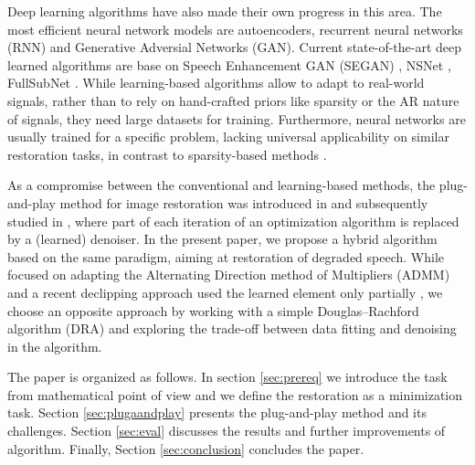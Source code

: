 \documentclass[conference]{IEEEtran}
\begin{document}
Deep learning algorithms have also made their own progress in this area.
The most efficient neural network models are autoencoders,
recurrent neural networks (RNN) and
Generative Adversial Networks (GAN).
Current state-of-the-art deep learned algorithms are base on Speech Enhancement GAN (SEGAN) \cite{Pascual2017}, NSNet \cite{Xia2020}, FullSubNet \cite{Hao2021}.
While learning-based algorithms allow to adapt to real-world signals, rather than to rely on hand-crafted priors like sparsity or the AR nature of signals, they need large datasets for training.
Furthermore, neural networks are usually trained for a specific problem, lacking universal applicability on similar restoration tasks, in contrast to sparsity-based methods \cite{Gaultier2017, Mokry202021, Zaviska2021}.

As a compromise between the conventional and learning-based methods, 
the plug-and-play method for image restoration was introduced in \cite{Venkatakrishnan2013} and subsequently studied in \cite{Chan2016},
where part of each iteration of an optimization algorithm is replaced by a (learned) denoiser.
In the present paper, we propose a hybrid algorithm based on the same paradigm, aiming at restoration of degraded speech.
While \cite{Chan2016} focused on adapting the Alternating Direction method of Multipliers (ADMM) and a recent declipping approach used the learned element only partially \cite{Tanaka2022}, we choose an opposite approach by working with a simple Douglas--Rachford algorithm (DRA) and exploring the trade-off between data fitting and denoising in the algorithm.



The paper is organized as follows. In section \ref{sec:prereq} we introduce the task from mathematical point of view and we define the restoration as a minimization task.
Section \ref{sec:plugaandplay} presents the plug-and-play method and its challenges.
Section \ref{sec:eval} discusses the results and further improvements of algorithm.
Finally, Section \ref{sec:conclusion} concludes the paper.
\end{document}
